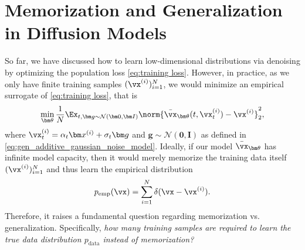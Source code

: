 \documentclass[../../book-main.tex]{subfiles}
\begin{document}
\section{Memorization and Generalization in Diffusion Models}


So far, we have discussed how to learn low-dimensional distributions via denoising by optimizing the population loss \eqref{eq:training loss}. However, in practice, as we only have finite training samples $(\vx^{(i)})_{i=1}^N$, we would minimize an empirical surrogate of \eqref{eq:training loss}, that is
\begin{equation}\label{eq:training loss-emp}
	\min_{\bm \theta} \frac{1}{N}\Ex_{t, \bm g \sim \mathcal{N}(\bm 0, \bm I)}\norm{\bar{\vx}_{\bm \theta}(t, \vx^{(i)}_t) - \vx^{(i)}}_{2}^{2},
\end{equation}
where $ \vx^{(i)}_t = \alpha_t \bm x^{(i)} + \sigma_t\bm g$ and $\bm g \sim \mathcal{N}(\bm 0, \bm I)$ as defined in \eqref{eq:gen_additive_gaussian_noise_model}.
Ideally, if our model $\bar{\vx}_{\bm \theta}$ has infinite model capacity, then it would merely memorize the training data itself $(\vx^{(i)})_{i=1}^N$ and thus learn the empirical distribution 
\begin{align*}
    p_{\text{emp}}(\vx) = \sum_{i=1}^N \delta(\vx -  \vx^{(i)}).
\end{align*}
Therefore, it raises a fundamental question regarding memorization vs. generalization. Specifically, \emph{how many training samples are required to learn the true data distribution $p_{\text{data}}$ instead of memorization?}



\end{document}
